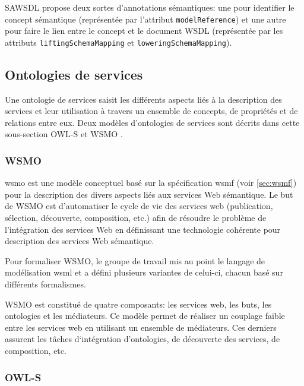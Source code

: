     \textsc{SAWSDL} propose deux sortes d'annotations sémantiques: une
    pour identifier le concept sémantique (représentée par l'attribut
    \texttt{modelReference}) et une autre pour faire le lien entre le
    concept et le document \textsc{WSDL} (représentée par les
    attributs \texttt{liftingSchemaMapping} et
    \texttt{loweringSchemaMapping}).

  \subsection{Ontologies de services}
  \label{sec:ont-serices}

  Une ontologie de services saisit les différents aspects liés à la
  description des services et leur utilisation à travers un ensemble
  de concepts, de propriétés et de relations entre eux. Deux modèles
  d'ontologies de services sont décrits dans cette sous-section
  \textsc{OWL-S} et \textsc{WSMO} \cite{elie2010}.

    \subsubsection{WSMO}
    \label{sec:wsmo}

    \acrshort{wsmo} \cite{de2005web} est une modèle conceptuel basé
    sur la spécification \acrshort{wsmf} \cite{fensel2002web} (voir
    \ref{sec:wsmf}) pour la description des divers aspects liés aux
    services Web sémantique. Le but de \textsc{WSMO} est d'automatiser
    le cycle de vie des services web (publication, sélection,
    découverte, composition, etc.) afin de résoudre le problème de
    l'intégration des services Web en définissant une technologie
    cohérente pour description des services Web sémantique.

    Pour formaliser \textsc{WSMO}, le groupe de travail mis au point
    le langage de modélisation \acrshort{wsml} \cite{de2006web} et a
    défini plusieurs variantes de celui-ci, chacun basé sur différents
    formalismes.

    \textsc{WSMO} est constitué de quatre composants: les services
    web, les buts, les ontologies et les médiateurs. Ce modèle permet
    de réaliser un couplage faible entre les services web en utilisant
    un ensemble de médiateurs. Ces derniers assurent les tâches
    d‘intégration d'ontologies, de découverte des services, de
    composition, etc.

    \subsubsection{OWL-S}
    \label{sec:owl-s-1}
\newpage
